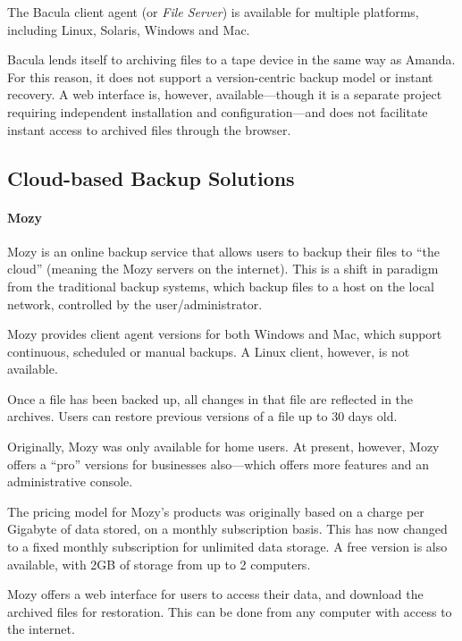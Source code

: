 \begin{bibunit}[plain]
The Bacula client agent (or \emph{File Server}) is available for multiple platforms,
including Linux, Solaris, Windows and Mac\cite{Bacula-features}.

Bacula lends itself to archiving files to a tape device in the same way as
Amanda.  For this reason, it does not support a version-centric backup model or
instant recovery. A web interface is, however, available---though it is
a separate project requiring independent installation and configuration---and
does not facilitate instant access to archived files through the
browser\cite{Bacula-about}.

\subsection{Cloud-based Backup Solutions}

\paragraph{Mozy}

Mozy is an online backup service that allows users to backup their files to
``the cloud'' (meaning the Mozy servers on the internet)\cite{Mozy}. This is
a shift in paradigm from the traditional backup systems, which backup files to
a host on the local network, controlled by the user/administrator. 

Mozy provides client agent versions for both Windows and Mac, which support
continuous, scheduled or manual backups. A Linux client, however, is not
available\cite{Mozy}.

Once a file has been backed up, all changes in that file are reflected in the
archives. Users can restore previous versions of a file up to 30 days
old\cite{Mozy}.

Originally, Mozy was only available for home users. At present, however, Mozy
offers a ``pro'' versions for businesses also---which offers more features and
an administrative console\cite{Mozy-crunchbase}.

The pricing model for Mozy's products was originally based on a charge per
Gigabyte of data stored, on a monthly subscription
basis\cite{Carbonite-report}. This has now changed to a fixed monthly
subscription for unlimited data storage. A free version is also available, with
2GB of storage from up to 2 computers\cite{Mozy}.

Mozy offers a web interface for users to access their data, and download the
archived files for restoration. This can be done from any computer with access
to the internet\cite{Mozy}.


\end{bibunit}
